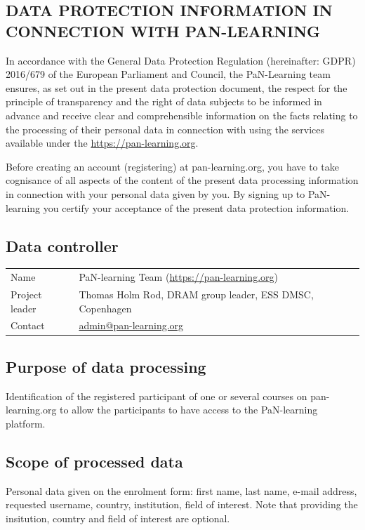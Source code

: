\documentclass[11pt]{article}
\begin{document}
\begin{center}
    \section*{DATA PROTECTION INFORMATION IN CONNECTION WITH PAN-LEARNING}
\end{center}

In accordance with the General Data Protection Regulation (hereinafter: GDPR) 2016/679 of the European Parliament and Council, the PaN-Learning team ensures, as set out in the present data protection document, the respect for the principle of transparency and the right of data subjects to be informed in advance and receive clear and comprehensible information on the facts relating to the processing of their personal data in connection with using the services available under the \href{https://pan-learning.org}{https://pan-learning.org}.

Before creating an account (registering) at pan-learning.org, you have to take cognisance of all aspects of the content of the present data processing information in connection with your personal data given by you. By signing up to PaN-learning you certify your acceptance of the present data protection information. 

\subsection{Data controller}
\begin{tabularx}{\textwidth}{@{} X l}
    Name    &  PaN-learning Team (\href{https://pan-learning.org}{https://pan-learning.org})  \\
    Project leader  & Thomas Holm Rod, DRAM group leader, ESS DMSC, Copenhagen \\
    Contact & \href{mailto:admin@pan-learning.org}{admin@pan-learning.org} \\
\end{tabularx}

\subsection{Purpose of data processing}	
Identification of the registered participant of one or several courses on pan-learning.org to allow the participants to have access to the PaN-learning platform. 

\subsection{Scope of processed data}
Personal data given on the enrolment form: first name, last name, e-mail address, requested username, country, institution, field of interest. Note that providing the insitution, country and field of interest are optional. 
\end{document}
